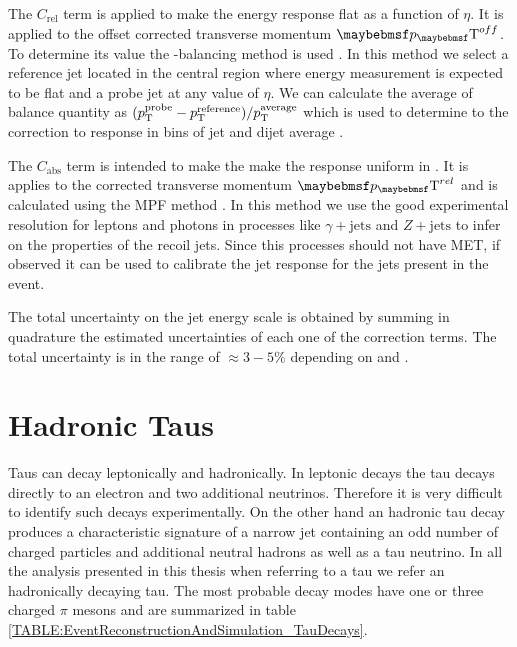 The $C_{\text{rel}}$ term is applied to make the energy response flat as a function of $\eta$. It is applied to the offset corrected transverse momentum $\pT^{off}$. To determine its value the \pt-balancing method is used \cite{ARTICLE:CMSDeterminationJetEnergyCalibration}. In this method we select a reference jet located in the central region where energy measurement is expected to be flat and a probe jet at any value of $\eta$. We can calculate the average of balance quantity as $(p_{\mathrm{T}}^{\text{probe}} - p_{\mathrm{T}}^{\text{reference}} ) / p_{\mathrm{T}}^{\text{average}}$ which is used to determine to the correction to response in bins of jet \eta and dijet average \pt. 

The $C_{\text{abs}}$ term is intended to make the make the response uniform in \pt. It is applies to the \eta corrected transverse momentum $\pT^{rel}$ and is calculated using the \gls{MPF} method \cite{ARTICLE:CDFDijetAngularDistribution}. In this method we use the good experimental resolution for leptons and photons in processes like $\gamma + \text{jets}$ and $Z + \text{jets}$ to infer on the properties of the recoil jets. Since this processes should not have \gls{MET}, if observed it can be used to calibrate the jet response for the jets present in the event.

The total uncertainty on the jet energy scale is obtained by summing in quadrature the estimated uncertainties of each one of the correction terms. The total uncertainty is in the range of $\approx 3-5\%$ depending on \pt and \eta \cite{ARTICLE:CMSDeterminationJetEnergyCalibration}.


\section{Hadronic Taus}
\label{SECTION:EventReconstructionAndSimulation_Taus}


Taus can decay leptonically and hadronically. In leptonic decays the tau decays directly to an electron and two additional neutrinos. Therefore it is very difficult to identify such decays experimentally. On the other hand an hadronic tau decay produces a characteristic signature of a narrow jet containing an odd number of charged particles and additional neutral hadrons as well as a tau neutrino. In all the analysis presented in this thesis when referring to a tau we refer an hadronically decaying tau. The most probable decay modes have one or three charged $\pi$ mesons and are summarized in table \ref{TABLE:EventReconstructionAndSimulation_TauDecays}. 

